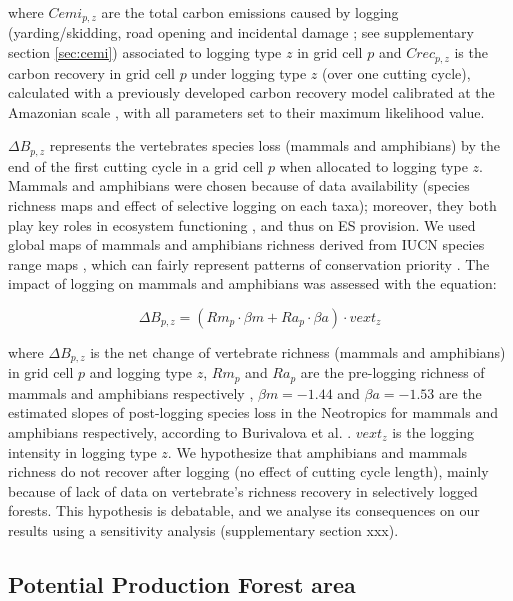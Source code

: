 \documentclass[12pt]{article}
\begin{document}
where $Cemi_{p,z}$ are the total carbon emissions caused by logging (yarding/skidding, road opening and incidental damage \cite{Piponiot2016}; see supplementary section \ref{sec:cemi}) associated to logging type $z$ in grid cell $p$  and $Crec_{p,z}$ is the carbon recovery in grid cell $p$ under logging type $z$ (over one cutting cycle), calculated with a previously developed carbon recovery model calibrated at the Amazonian scale \cite{Piponiot2016a}, with all parameters set to their maximum likelihood value. 

$\Delta B_{p,z}$ represents the vertebrates species loss (mammals and amphibians) by the end of the first cutting cycle in a grid cell $p$ when allocated to logging type $z$. Mammals and amphibians were chosen because of data availability (species richness maps and effect of selective logging on each taxa); moreover, they both play key roles in ecosystem functioning \cite{Wright2000,Muscarella2007,Fleming2009,Valencia-Aguilar2013}, and thus on ES provision. 
We used global maps of mammals and amphibians richness derived from IUCN species range maps \cite{Jenkins2013}, which can fairly represent patterns of conservation priority \cite{Marechaux2017}.
The impact of logging on mammals and amphibians was assessed with the equation: 

\begin{equation}
\label{eq:rloss}
\Delta B_{p,z} = \left(Rm_{p} \cdot \beta m + Ra_{p} \cdot \beta a  \right)  \cdot vext_z
\end{equation}

where $\Delta B_{p,z}$ is the net change of vertebrate richness (mammals and amphibians) in grid cell $p$ and logging type $z$, $Rm_{p}$ and $Ra_p$ are the pre-logging richness of mammals and amphibians respectively \cite{Jenkins2013}, $\beta m = - 1.44$ and $\beta a = - 1.53$  are the estimated slopes of post-logging species loss in the Neotropics for mammals and amphibians respectively, according to Burivalova et al. \cite{Burivalova2014}. $vext_z$ is the logging intensity in logging type $z$.
We hypothesize that amphibians and mammals richness do not recover after logging (no effect of cutting cycle length), mainly because of lack of data on vertebrate's richness recovery in selectively logged forests. This hypothesis is debatable, and we analyse its consequences on our results using a sensitivity analysis (supplementary section xxx). 

\subsection*{Potential Production Forest area}
\label{sec:ppf}
\end{document}
